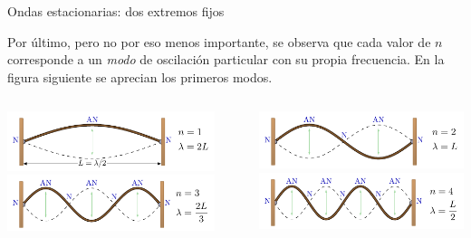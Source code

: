 \documentclass[11pt,handout,aspectratio=1610]{beamer}
\newcommand{\vs}{\vspace{11pt}}
\begin{document}
\begin{frame}{Ondas estacionarias: dos extremos fijos}

    Por último, pero no por eso menos importante, se observa que cada valor de $n$ corresponde a un \emph{modo} de oscilación particular con su propia frecuencia. En la figura siguiente se aprecian los primeros modos.

    \vs

    \begin{columns}
        \begin{column}{0.45\textwidth}
            \includegraphics[width=1.\textwidth]{../figs/waves_standing-3.pdf} \\
            \includegraphics[width=1.\textwidth]{../figs/waves_standing-5.pdf}
        \end{column}
        ~
        \begin{column}{0.45\textwidth}
            \includegraphics[width=1.\textwidth]{../figs/waves_standing-4.pdf} \\
            \includegraphics[width=1.\textwidth]{../figs/waves_standing-6.pdf}
        \end{column}
    \end{columns}

\end{frame}
\end{document}
